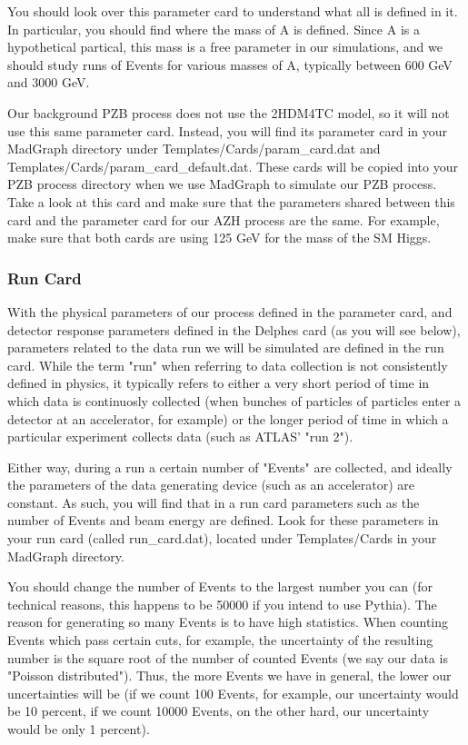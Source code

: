 \documentclass{article}
\begin{document}
\bigskip

You should look over this parameter card to understand what all is defined in it. In
particular, you should find where the mass of A is defined. Since A is a hypothetical partical, this mass is a free parameter
in our simulations, and we should study runs of Events for various masses of A, typically between 600 GeV and 3000 GeV.

\bigskip

Our background PZB process does not use the 2HDM4TC model, so it will not use this same parameter card. Instead, you will
find its parameter card in your MadGraph directory under Templates/Cards/param\_card.dat and Templates/Cards/param\_card\_default.dat.
These cards will be copied into your PZB process directory when we use MadGraph to simulate our PZB process. Take a look at this card
and make sure that the parameters shared between this card and the parameter card for our AZH process are the same. For example,
make sure that both cards are using 125 GeV for the mass of the SM Higgs.

\subsubsection{Run Card}
\label{sec:runCard}

With the physical parameters of our process defined in the parameter card, and detector response parameters defined in the Delphes card (as you will see below),
parameters related to the data run we will be simulated are defined in the run card. While the term "run" when referring to data collection
is not consistently defined in physics, it typically refers to either a very short period of time in which data is continuosly collected (when bunches
of particles of particles enter a detector at an accelerator, for example) or the longer period of time in which a particular experiment collects data
(such as ATLAS' "run 2").

\bigskip

Either way, during a run a certain number of "Events" are collected, and ideally the parameters of the data generating device (such as
an accelerator) are constant. As such, you will find that in a run card parameters such as the number of Events and beam energy are defined.
Look for these parameters in your run card (called run\_card.dat), located under Templates/Cards in your MadGraph directory.

\bigskip

You should change the number of Events to the largest number you can (for technical reasons, this happens to be 50000 if you intend to use Pythia).
The reason for generating so many Events is to have high statistics. When counting Events which pass certain cuts, for example, the uncertainty of
the resulting number is the square root of the number of counted Events (we say our data is "Poisson distributed"). Thus, the more Events we have
in general, the lower our uncertainties will be (if we count 100 Events, for example, our uncertainty would be 10 percent, if we count 10000 Events,
on the other hard, our uncertainty would be only 1 percent).
\end{document}
